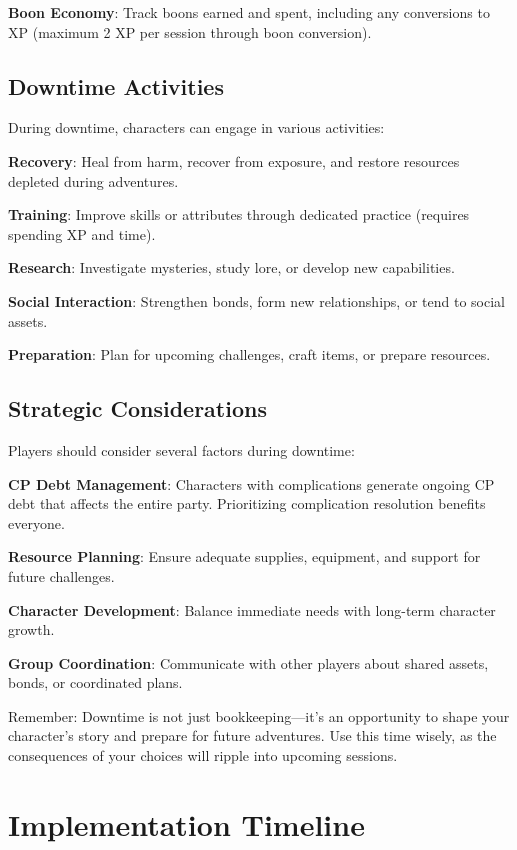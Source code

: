 \textbf{Boon Economy}: Track boons earned and spent, including any conversions to XP (maximum 2 XP per session through boon conversion).

\subsection{Downtime Activities}

During downtime, characters can engage in various activities:

\textbf{Recovery}: Heal from harm, recover from exposure, and restore resources depleted during adventures.

\textbf{Training}: Improve skills or attributes through dedicated practice (requires spending XP and time).

\textbf{Research}: Investigate mysteries, study lore, or develop new capabilities.

\textbf{Social Interaction}: Strengthen bonds, form new relationships, or tend to social assets.

\textbf{Preparation}: Plan for upcoming challenges, craft items, or prepare resources.

\subsection{Strategic Considerations}

Players should consider several factors during downtime:

\textbf{CP Debt Management}: Characters with complications generate ongoing CP debt that affects the entire party. Prioritizing complication resolution benefits everyone.

\textbf{Resource Planning}: Ensure adequate supplies, equipment, and support for future challenges.

\textbf{Character Development}: Balance immediate needs with long-term character growth.

\textbf{Group Coordination}: Communicate with other players about shared assets, bonds, or coordinated plans.

Remember: Downtime is not just bookkeeping—it's an opportunity to shape your character's story and prepare for future adventures. Use this time wisely, as the consequences of your choices will ripple into upcoming sessions.

\section{Implementation Timeline}

